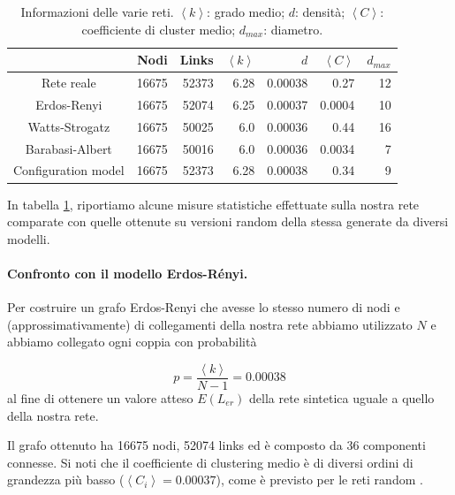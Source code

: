     \begin{table}[pb]
        \centering
        \small
        \begin{tabular}{|c|rrrrrr|} 
            \hline
             & Nodi & Links & $\left<k\right>$ & $\,d$ & $\left<C\right>$ & $d_{max}$ \\ 
            \hline
            Rete reale & 16675 & 52373 & 6.28 & 0.00038 & 0.27 & 12 \\
            Erdos-Renyi & 16675 & 52074 & 6.25 & 0.00037 & 0.0004 & 10 \\
            Watts-Strogatz & 16675 & 50025 & 6.0 & 0.00036 & 0.44 & 16 \\
            Barabasi-Albert & 16675 & 50016 & 6.0 & 0.00036 & 0.0034 & 7 \\
            Configuration model & 16675 & 52373 & 6.28 & 0.00038 & 0.34 & 9 \\
            \hline
        \end{tabular}
        \caption{Informazioni delle varie reti. $\left<k\right>$: grado medio; $d$: densità; $\left<C\right>$: coefficiente di cluster medio; $d_{max}$: diametro.}
        \label{table: networks_comparison}
    \end{table}

    In tabella \ref{table: networks_comparison}, riportiamo alcune misure statistiche effettuate sulla nostra rete comparate con quelle ottenute su versioni random della stessa generate da diversi modelli. 
    
    \paragraph{\tab Confronto con il modello Erdos-Rényi.} Per costruire un grafo Erdos-Renyi che avesse lo stesso numero di nodi e (approssimativamente) di collegamenti della nostra rete abbiamo utilizzato $N$ e abbiamo collegato ogni coppia con probabilità

            \begin{equation}
                p = \frac{\left<k\right>}{N-1} = 0.00038
            \end{equation}
    al fine di ottenere un valore atteso $E(L_{er})$ della rete sintetica uguale a quello della nostra rete.
        
    Il grafo ottenuto ha 16675 nodi, 52074 links ed è composto da 36 componenti connesse. Si noti che il coefficiente di clustering medio è di diversi ordini di grandezza più basso ($\left< C_i \right> =0.00037$), come è previsto per le reti random \cite{barabasicap3}. 
        
